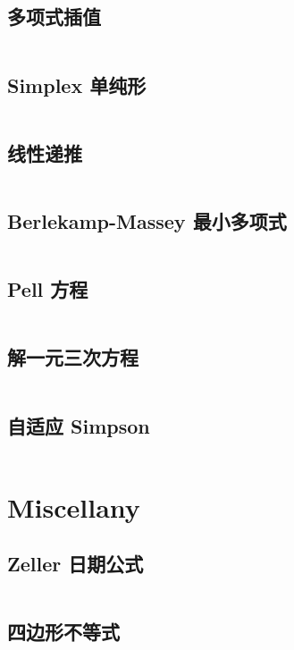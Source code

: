\documentclass[titlepage, a4paper]{article}
\begin{document}
\begin{multicols}{2}
\begin{spacing}{0.6}
				\subsection{多项式插值}
				\inputminted{cpp}{src/Math/插值.cpp}
				\subsection{Simplex 单纯形 \checkmark}
				\inputminted{cpp}{src/Math/Simplex.cpp}
				\subsection{线性递推}
				\inputminted{cpp}{src/Math/线性递推.cpp}
				\subsection{Berlekamp-Massey 最小多项式}
				\inputminted{cpp}{src/Math/Berlekamp-Massey.cpp}
				\subsection{Pell 方程}
				\inputminted{cpp}{src/Math/Pell方程.cpp}
				\subsection{解一元三次方程}
				\inputminted{cpp}{src/Math/解一元三次方程.cpp}
				\subsection{自适应 Simpson}
				\inputminted{cpp}{src/Math/Simpson.cpp}
			
			\section{Miscellany}
				\subsection{Zeller 日期公式 \checkmark}
				\inputminted{cpp}{src/Miscellany/日期公式.cpp}
				\subsection{四边形不等式 \checkmark}
				\inputminted{cpp}{src/Miscellany/2D1D.cpp}
				

\end{spacing}
\end{multicols}
\end{document}
